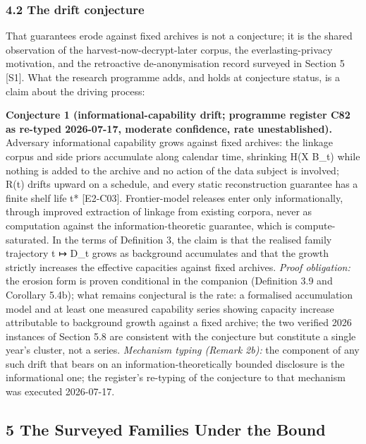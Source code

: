 \documentclass[
  11pt,
]{article}
\begin{document}
\subsubsection{4.2 The drift conjecture}\label{the-drift-conjecture}

That guarantees erode against fixed archives is not a conjecture; it is
the shared observation of the harvest-now-decrypt-later corpus, the
everlasting-privacy motivation, and the retroactive de-anonymisation
record surveyed in Section 5 {[}S1{]}. What the research programme adds,
and holds at conjecture status, is a claim about the driving process:

\textbf{Conjecture 1 (informational-capability drift; programme register
C82 as re-typed 2026-07-17, moderate confidence, rate unestablished).}
Adversary informational capability grows against fixed archives: the
linkage corpus and side priors accumulate along calendar time, shrinking
H(X \textbar{} B\_t) while nothing is added to the archive and no action
of the data subject is involved; R(t) drifts upward on a schedule, and
every static reconstruction guarantee has a finite shelf life t*
{[}E2-C03{]}. Frontier-model releases enter only informationally,
through improved extraction of linkage from existing corpora, never as
computation against the information-theoretic guarantee, which is
compute-saturated. In the terms of Definition 3, the claim is that the
realised family trajectory t ↦ D\_t grows as background accumulates and
that the growth strictly increases the effective capacities against
fixed archives. \emph{Proof obligation:} the erosion form is proven
conditional in the companion (Definition 3.9 and Corollary 5.4b); what
remains conjectural is the rate: a formalised accumulation model and at
least one measured capability series showing capacity increase
attributable to background growth against a fixed archive; the two
verified 2026 instances of Section 5.8 are consistent with the
conjecture but constitute a single year's cluster, not a series.
\emph{Mechanism typing (Remark 2b):} the component of any such drift
that bears on an information-theoretically bounded disclosure is the
informational one; the register's re-typing of the conjecture to that
mechanism was executed 2026-07-17.

\subsection{5 The Surveyed Families Under the
Bound}\label{the-surveyed-families-under-the-bound}
\end{document}
